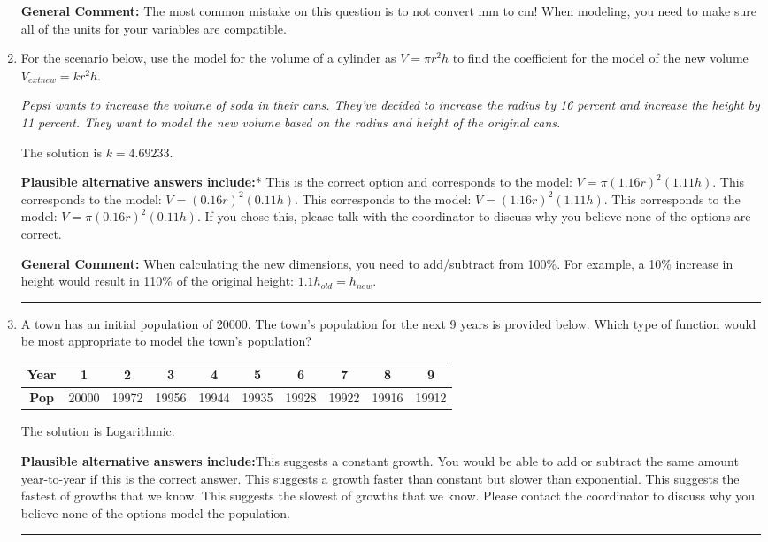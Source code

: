\documentclass{extbook}[14pt]
\newcommand{\litem}[1]{\item #1

\rule{\textwidth}{0.4pt}}
\begin{document}
\begin{enumerate}
{\textbf{General Comment:} The most common mistake on this question is to not convert mm to cm! When modeling, you need to make sure all of the units for your variables are compatible.
}
\litem{
For the scenario below, use the model for the volume of a cylinder as $V = \pi r^2 h$ to find the coefficient for the model of the new volume $V_{	ext{new}} = k r^2 h$.

\begin{center}
    \textit{ Pepsi wants to increase the volume of soda in their cans. They've decided to increase the radius by 16 percent and increase the height by 11 percent. They want to model the new volume based on the radius and height of the original cans. }
\end{center}
The solution is \( k = 4.69233 \).\begin{enumerate}[label=\Alph*.]
\textbf{Plausible alternative answers include:}* This is the correct option and corresponds to the model: $V = \pi (1.16 r)^2 (1.11 h)$.
This corresponds to the model: $V = (0.16 r)^2 (0.11 h)$.
This corresponds to the model: $V = (1.16 r)^2 (1.11 h)$.
This corresponds to the model: $V = \pi (0.16 r)^2 (0.11 h)$.
If you chose this, please talk with the coordinator to discuss why you believe none of the options are correct.
\end{enumerate}

\textbf{General Comment:} When calculating the new dimensions, you need to add/subtract from 100\%. For example, a 10\% increase in height would result in 110\% of the original height: $1.1h_{old} = h_{new}$.
}
\litem{
A town has an initial population of 20000. The town's population for the next 9 years is provided below. Which type of function would be most appropriate to model the town's population?


\begin{tabular}{c|c|c|c|c|c|c|c|c|c}
\textbf{Year} &1 &2 &3 &4 &5 &6 &7 &8 &9\tabularnewline \hline
\textbf{Pop} &20000 &19972 &19956 &19944 &19935 &19928 &19922 &19916 &19912\end{tabular}The solution is \( \text{Logarithmic} \).\begin{enumerate}[label=\Alph*.]
\textbf{Plausible alternative answers include:}This suggests a constant growth. You would be able to add or subtract the same amount year-to-year if this is the correct answer.
This suggests a growth faster than constant but slower than exponential.
This suggests the fastest of growths that we know.
This suggests the slowest of growths that we know.
Please contact the coordinator to discuss why you believe none of the options model the population.
\end{enumerate}

}
\end{enumerate}
\end{document}
